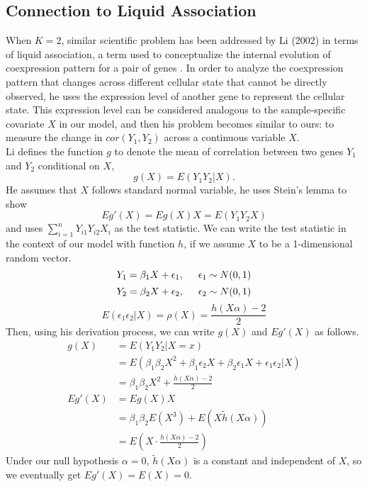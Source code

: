 \documentclass[12pt]{article}
\theoremstyle{theorem}
\begin{document}
\subsection{Connection to Liquid Association}
When $K=2$, similar scientific problem has been addressed by Li (2002) in terms of liquid association, a term used to conceptualize the internal evolution of coexpression pattern for a pair of genes \cite{li2002genome}. In order to analyze the coexpression pattern that changes across different cellular state that cannot be directly observed, he uses the expression level of another gene to represent the cellular state. This expression level can be considered analogous to the sample-specific covariate $X$ in our model, and then his problem becomes similar to ours: to measure the change in $cor(Y_1, Y_2)$ across a continuous variable $X$. \\

\noindent Li defines the function $g$ to denote the mean of correlation between two genes $Y_1$ and $Y_2$ conditional on $X$,
$$g(X) = E(Y_1 Y_2 | X).$$
He assumes that $X$ follows standard normal variable, he uses Stein's lemma to show
$$Eg'(X) = Eg(X)X = E(Y_1Y_2X)$$
and uses $\sum_{i=1}^{n} Y_{i1}Y_{i2}X_i$ as the test statistic. We can write the test statistic in the context of our model with function $h$, if we assume $X$ to be a 1-dimensional random vector. 
$$Y_1 = \beta_1X + \epsilon_1, \hspace{5mm} \epsilon_1 \sim N(0,1)$$
$$Y_2 = \beta_2 X + \epsilon_2, \hspace{5mm} \epsilon_2 \sim N(0,1)$$
$$E(\epsilon_1 \epsilon_2 | X) = \rho(X) = \frac{h(X\alpha)-2}{2}$$
Then, using his derivation process, we can write $g(X)$ and $Eg'(X)$ as follows.
\begin{align*}
g(X) &= E(Y_1Y_2 | X = x)\\
&= E(\beta_1\beta_2 X^2 + \beta_1\epsilon_2X + \beta_2\epsilon_1X + \epsilon_1\epsilon_2 | X)\\
&= \beta_1 \beta_2 X^2  +\frac{h(X\alpha)-2}{2}\\
Eg'(X) &= Eg(X)X\\
&= \beta_1\beta_2E(X^3) + E\left( X\tilde{h}(X\alpha)\right)\\
&= E\left( X \cdot \frac{h(X\alpha)-2}{2}\right)
\end{align*}
Under our null hypothesis $\alpha = 0$, $\tilde{h}(X\alpha)$ is a constant and independent of $X$, so we eventually get $Eg'(X) = E(X) = 0$.\\
\end{document}
